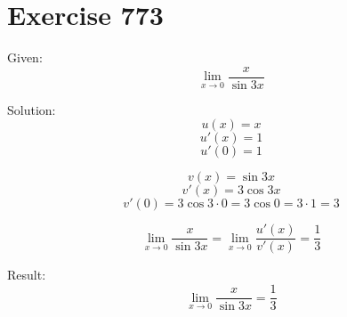 \documentclass[a4paper, 10pt]{scrartcl}
\begin{document}
\section{Exercise 773}

Given:
\[
\lim_{x\to 0}{\frac{x}{\sin{3x}}}
\]

Solution:
\[
u(x) = x
\]
\[
u'(x) = 1
\]
\[
u'(0) = 1
\]

\[
v(x) = \sin{3x}
\]
\[
v'(x) = 3\cos{3x}
\]
\[
v'(0) = 3\cos{3\cdot 0} = 3\cos{0} = 3\cdot 1 = 3
\]

\[
\lim_{x\to 0}{\frac{x}{\sin{3x}}} = \lim_{x\to 0}{\frac{u'(x)}{v'(x)}} = \frac{1}{3}
\]

Result:
\[
\lim_{x\to 0}{\frac{x}{\sin{3x}}} = \frac{1}{3}
\]
\end{document}
